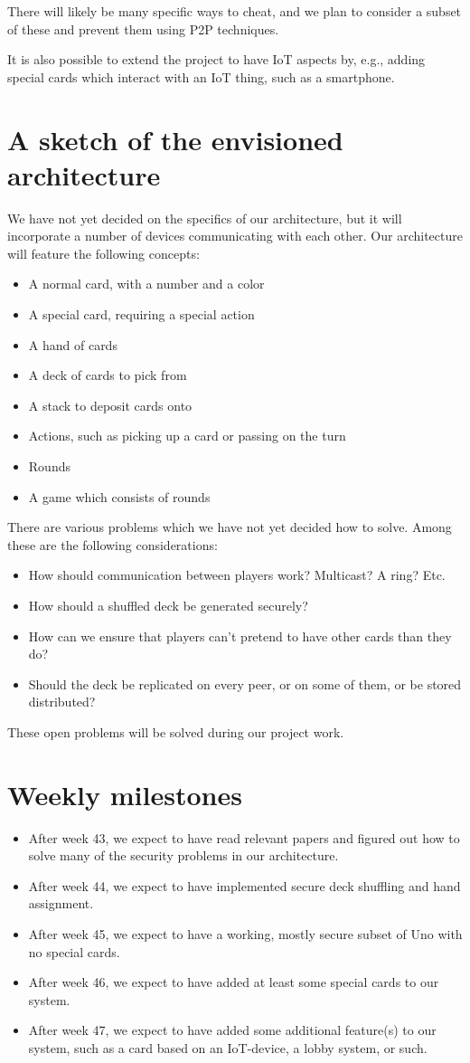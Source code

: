 \documentclass{article}
\begin{document}
There will likely be many specific ways to cheat, and we plan to consider a
subset of these and prevent them using P2P techniques.

It is also possible to extend the project to have IoT aspects by, e.g., adding
special cards which interact with an IoT thing, such as a smartphone.

\section*{A sketch of the envisioned architecture}
We have not yet decided on the specifics of our architecture, but it will
incorporate a number of devices communicating with each other. Our
architecture will feature the following concepts:
\begin{itemize}
\item A normal card, with a number and a color
\item A special card, requiring a special action
\item A hand of cards
\item A deck of cards to pick from
\item A stack to deposit cards onto
\item Actions, such as picking up a card or passing on the turn
\item Rounds
\item A game which consists of rounds
\end{itemize}
There are various problems which we have not yet decided how to solve. Among
these are the following considerations:
\begin{itemize}
\item How should communication between players work? Multicast? A ring? Etc.
\item How should a shuffled deck be generated securely?
\item How can we ensure that players can't pretend to have other cards than
they do?
\item Should the deck be replicated on every peer, or on some of them, or be
stored distributed?
\end{itemize}
These open problems will be solved during our project work.


\section*{Weekly milestones}
\begin{itemize}
\item After week 43, we expect to have read relevant papers and figured out
how to solve many of the security problems in our architecture.
\item After week 44, we expect to have implemented secure deck shuffling and
hand assignment.
\item After week 45, we expect to have a working, mostly secure subset of Uno
with no special cards.
\item After week 46, we expect to have added at least some special cards to
our system.
\item After week 47, we expect to have added some additional feature(s) to our
system, such as a card based on an IoT-device, a lobby system, or such.
\end{itemize}
\end{document}
